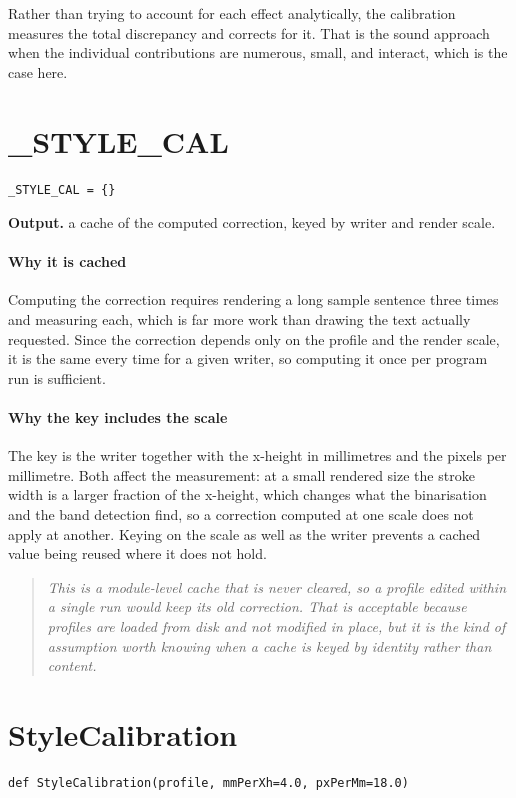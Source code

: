 Rather than trying to account for each effect analytically, the calibration measures the total discrepancy and corrects for it. That is the sound approach when the individual contributions are numerous, small, and interact, which is the case here.


\section{\_STYLE\_CAL}
\begin{lstlisting}[style=sig]
_STYLE_CAL = {}
\end{lstlisting}

\noindent\textbf{Output.} a cache of the computed correction, keyed by writer and render scale.


\paragraph{Why it is cached}
Computing the correction requires rendering a long sample sentence three times and measuring each, which is far more work than drawing the text actually requested. Since the correction depends only on the profile and the render scale, it is the same every time for a given writer, so computing it once per program run is sufficient.


\paragraph{Why the key includes the scale}
The key is the writer together with the x-height in millimetres and the pixels per millimetre. Both affect the measurement: at a small rendered size the stroke width is a larger fraction of the x-height, which changes what the binarisation and the band detection find, so a correction computed at one scale does not apply at another. Keying on the scale as well as the writer prevents a cached value being reused where it does not hold.


\begin{quote}\small\itshape This is a module-level cache that is never cleared, so a profile edited within a single run would keep its old correction. That is acceptable because profiles are loaded from disk and not modified in place, but it is the kind of assumption worth knowing when a cache is keyed by identity rather than content.\end{quote}

\section{StyleCalibration}
\begin{lstlisting}[style=sig]
def StyleCalibration(profile, mmPerXh=4.0, pxPerMm=18.0)
\end{lstlisting}


